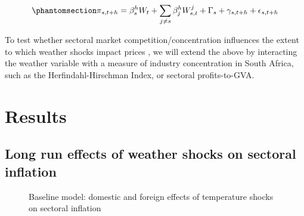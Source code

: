 \documentclass[
  letterpaper,
  DIV=11,
  numbers=noendperiod]{scrartcl}
\begin{document}
\begin{equation}\phantomsection\label{eq-sa_h_inflation}{
\pi_{s,t+h} = \beta_s^h W_t+ \sum_{j \neq s} \beta_j^h W_{s,t}^j + \Gamma_{s} + \gamma_{s,t+h} + \epsilon_{s,t+h}       
}\end{equation}

To test whether sectoral market competition/concentration influences the
extent to which weather shocks impact prices \citep{weber2023}, we will
extend the above by interacting the weather variable with a measure of
industry concentration in South Africa, such as the Herfindahl-Hirschman
Index, or sectoral profits-to-GVA.

\section{Results}\label{results}

\subsection{Long run effects of weather shocks on sectoral
inflation}\label{long-run-effects-of-weather-shocks-on-sectoral-inflation}

\begin{figure}[H]


\caption{\label{fig-baseline_temp}Baseline model: domestic and foreign
effects of temperature shocks on sectoral inflation}

\end{figure}%
\end{document}
